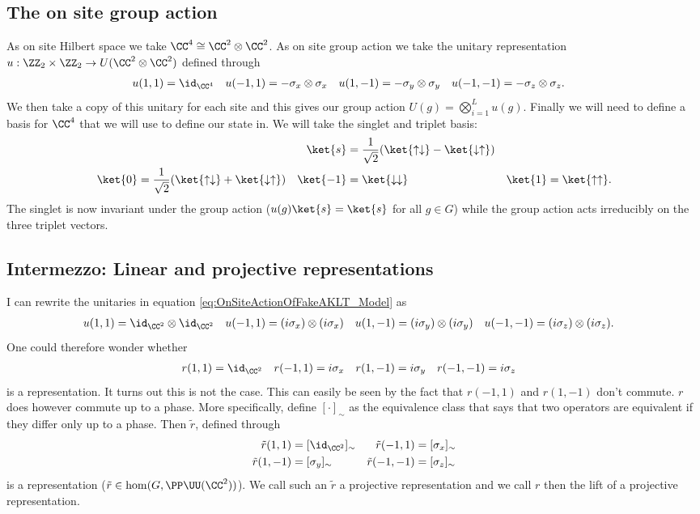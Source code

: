 \subsection{The on site group action}
As on site Hilbert space we take $\CC^4\cong \CC^2\otimes\CC^2$. As on site group action we take the unitary representation $u:\ZZ_2\times\ZZ_2\rightarrow U(\CC^2\otimes\CC^2)$ defined through
\begin{align}\label{eq:OnSiteActionOfFakeAKLT_Model}
	u(1,1)&=\id_{\CC^4}&u(-1,1)&=-\sigma_x\otimes\sigma_x&u(1,-1)&=-\sigma_y\otimes\sigma_y&u(-1,-1)&=-\sigma_z\otimes\sigma_z.
\end{align}
We then take a copy of this unitary for each site and this gives our group action $U(g)=\bigotimes_{i=1}^{L}u(g)$. Finally we will need to define a basis for $\CC^4$ that we will use to define our state in. We will take the singlet and triplet basis:
\begin{align}
	&&\ket{s}&=\frac{1}{\sqrt{2}}(\ket{\uparrow\downarrow}-\ket{\downarrow\uparrow})&&\\
	\ket{0}&=\frac{1}{\sqrt{2}}(\ket{\uparrow\downarrow}+\ket{\downarrow\uparrow})&\ket{-1}&=\ket{\downarrow\downarrow}&\ket{1}&=\ket{\uparrow\uparrow}.
\end{align}
The singlet is now invariant under the group action ($u(g)\ket{s}=\ket{s}$ for all $g\in G$) while the group action acts irreducibly on the three triplet vectors.
\subsection{Intermezzo: Linear and projective representations}
I can rewrite the unitaries in equation \eqref{eq:OnSiteActionOfFakeAKLT_Model} as
\begin{align}\label{eq:OnSiteActionOfFakeAKLT_Model_Rewritten}
	u(1,1)&=\id_{\CC^2}\otimes\id_{\CC^2}&u(-1,1)&=(i\sigma_x)\otimes(i\sigma_x)&u(1,-1)&=(i\sigma_y)\otimes(i\sigma_y)&u(-1,-1)&=(i\sigma_z)\otimes(i\sigma_z).
\end{align}
One could therefore wonder whether
\begin{align}\label{eq:OnSiteActionOfFakeAKLT_Model_OnC2}
	r(1,1)&=\id_{\CC^2}&r(-1,1)&=i\sigma_x&r(1,-1)&=i\sigma_y&r(-1,-1)&=i\sigma_z
\end{align}
is a representation. It turns out this is not the case. This can easily be seen by the fact that $r(-1,1)$ and $r(1,-1)$ don't commute. $r$ does however commute up to a phase. More specifically, define $[\cdot]_\sim$ as the equivalence class that says that two operators are equivalent if they differ only up to a phase. Then $\tilde{r}$, defined through
\begin{align}\label{eq:OnSiteActionOfFakeAKLT_Model_OnC2_ProjectiveRep}
	\tilde r(1,1)&=[\id_{\CC^2}]_\sim&\tilde r(-1,1)&=[\sigma_x]_\sim\\
	\tilde r(1,-1)&=[\sigma_y]_\sim&\tilde r(-1,-1)&=[\sigma_z]_\sim
\end{align}
is a representation ($\tilde{r}\in\hom(G,\PP\UU(\CC^2))$). We call such an $\tilde{r}$ a projective representation and we call $r$ then the lift of a projective representation.
